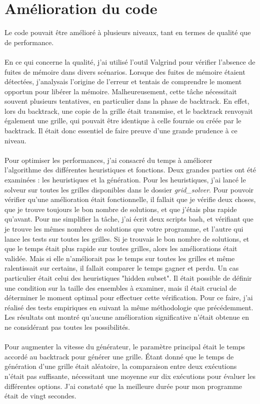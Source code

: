 \documentclass{article}
\begin{document}
\section{Amélioration du code}

Le code pouvait être amélioré à plusieurs niveaux, tant en termes de qualité que
de performance.
\\ \\
En ce qui concerne la qualité, j'ai utilisé l'outil Valgrind pour vérifier 
l'absence de fuites de mémoire dans divers scénarios. Lorsque des fuites de 
mémoire étaient détectées, j'analysais l'origine de l'erreur et tentais de 
comprendre le moment opportun pour libérer la mémoire. Malheureusement, cette 
tâche nécessitait souvent plusieurs tentatives, en particulier dans la phase de 
backtrack. En effet, lors du backtrack, une copie de la grille était transmise,
et le backtrack renvoyait également une grille, qui pouvait être identique à 
celle fournie ou créée par le backtrack. Il était donc essentiel de faire 
preuve d'une grande prudence à ce niveau.
\\ \\
Pour optimiser les performances, j'ai consacré du temps à améliorer \\ 
l'algorithme des différentes heuristiques et fonctions. Deux grandes parties 
ont été examinées : les heuristiques et la génération. Pour les heuristiques, 
j'ai lancé le solveur sur toutes les grilles disponibles dans le dossier 
\textit{grid\_solver}. Pour pouvoir vérifier qu'une amélioration était 
fonctionnelle, il fallait que je vérifie deux choses, que je trouve toujours le
bon nombre de solutions, et que j'étais plus rapide qu'avant. Pour me 
simplifier la tâche, j'ai écrit deux scripts bash, et vérifiant que je trouve 
les mêmes nombres de solutions que votre programme, et l'autre qui lance les 
tests sur toutes les grilles. Si je trouvais le bon nombre de solutions, et 
que le temps était plus rapide sur toutes grilles, alors les améliorations 
était validée. Mais si elle n'améliorait pas le temps sur toutes les grilles 
et même ralentissait sur certains, il fallait comparer le temps gagner et 
perdu. Un cas particulier était celui des heuristiques "hidden subset". Il 
était possible de définir une condition sur la taille des ensembles à examiner,
mais il était crucial de déterminer le moment optimal pour effectuer cette 
vérification. Pour ce faire, j'ai réalisé des tests empiriques en suivant la 
même méthodologie que précédemment. Les résultats ont montré qu'aucune 
amélioration significative n'était obtenue en ne considérant pas toutes les
possibilités.
\\ \\
Pour augmenter la vitesse du générateur, le paramètre principal était le temps 
accordé au backtrack pour générer une grille. Étant donné que le temps de
génération d'une grille était aléatoire, la comparaison entre deux exécutions
n'était pas suffisante, nécessitant une moyenne sur dix exécutions pour 
évaluer les différentes options. J'ai constaté que la meilleure durée pour 
mon programme était de vingt secondes.
\end{document}
